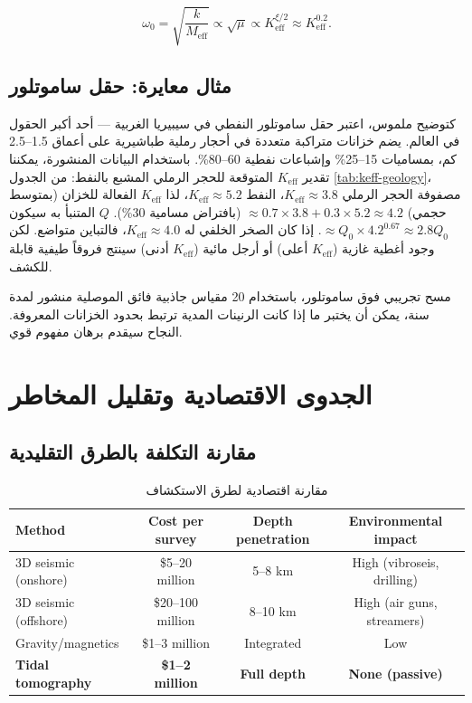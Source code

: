 \documentclass[12pt,a4paper]{article}
\newcommand{\Keff}{K_{\mathrm{eff}}}
\theoremstyle{remark}
\begin{document}
	\begin{equation}
		\omega_0 = \sqrt{\frac{k}{M_{\text{eff}}}} \propto \sqrt{\mu} \propto \Keff^{\xi/2} \approx \Keff^{0.2}.
		\label{eq:omega_keff}
	\end{equation}
	
	\subsection{مثال معايرة: حقل ساموتلور}
	
	كتوضيح ملموس، اعتبر حقل ساموتلور النفطي في سيبيريا الغربية — أحد أكبر الحقول في العالم. يضم خزانات متراكبة متعددة في أحجار رملية طباشيرية على أعماق 1.5–2.5 كم، بمساميات 15–25\% وإشباعات نفطية 60–80\%. باستخدام البيانات المنشورة، يمكننا تقدير \(\Keff\) المتوقعة للحجر الرملي المشبع بالنفط: من الجدول \ref{tab:keff-geology}، مصفوفة الحجر الرملي \(\Keff \approx 3.8\)، النفط \(\Keff \approx 5.2\)، لذا \(\Keff\) الفعالة للخزان (بمتوسط حجمي) \(\approx 0.7 \times 3.8 + 0.3 \times 5.2 \approx 4.2\) (بافتراض مسامية 30\%). \(Q\) المتنبأ به سيكون \(\approx Q_0 \times 4.2^{0.67} \approx 2.8 Q_0\). إذا كان الصخر الخلفي له \(\Keff \approx 4.0\)، فالتباين متواضع. لكن وجود أغطية غازية (\(\Keff\) أعلى) أو أرجل مائية (\(\Keff\) أدنى) سينتج فروقاً طيفية قابلة للكشف.
	
	مسح تجريبي فوق ساموتلور، باستخدام 20 مقياس جاذبية فائق الموصلية منشور لمدة سنة، يمكن أن يختبر ما إذا كانت الرنينات المدية ترتبط بحدود الخزانات المعروفة. النجاح سيقدم برهان مفهوم قوي.
	
	\section{الجدوى الاقتصادية وتقليل المخاطر}
	\label{sec:economics}
	
	\subsection{مقارنة التكلفة بالطرق التقليدية}
	
	\begin{otherlanguage}{english}
		\begin{table}[htbp]
			\centering
			\caption{مقارنة اقتصادية لطرق الاستكشاف}
			\label{tab:economics}
			\small
			\begin{tabular}{lccc}
				\toprule
				\textbf{Method} & \textbf{Cost per survey} & \textbf{Depth penetration} & \textbf{Environmental impact} \\
				\midrule
				3D seismic (onshore) & \$5–20 million & 5–8 km & High (vibroseis, drilling) \\
				3D seismic (offshore) & \$20–100 million & 8–10 km & High (air guns, streamers) \\
				Gravity/magnetics & \$1–3 million & Integrated & Low \\
				\textbf{Tidal tomography} & \textbf{\$1–2 million} & \textbf{Full depth} & \textbf{None (passive)} \\
				\bottomrule
			\end{tabular}
		\end{table}
	\end{otherlanguage}
	
\end{document}
